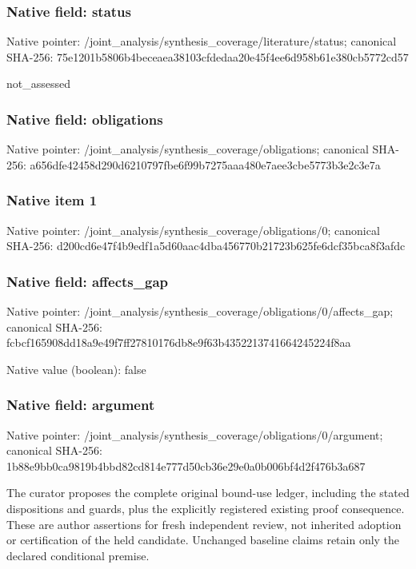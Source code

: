 \documentclass[10pt,a4paper]{article}
\begin{document}
\subsubsection{Native field: status}
Native pointer: /joint\_\allowbreak{}analysis/synthesis\_\allowbreak{}coverage/literature/status; canonical SHA-256: 75e1201b5806b4beceaea38103cfdedaa20e45f4ee6d958b61e380cb5772cd57

\begingroup\raggedright\sloppy not\_\allowbreak{}assessed\par\endgroup

\subsubsection{Native field: obligations}
Native pointer: /joint\_\allowbreak{}analysis/synthesis\_\allowbreak{}coverage/obligations; canonical SHA-256: a656dfe42458d290d6210797fbe6f99b7275aaa480e7aee3cbe5773b3e2c3e7a

\subsubsection{Native item 1}
Native pointer: /joint\_\allowbreak{}analysis/synthesis\_\allowbreak{}coverage/obligations/0; canonical SHA-256: d200cd6e47f4b9edf1a5d60aac4dba456770b21723b625fe6dcf35bca8f3afdc

\subsubsection{Native field: affects\_\allowbreak{}gap}
Native pointer: /joint\_\allowbreak{}analysis/synthesis\_\allowbreak{}coverage/obligations/0/affects\_\allowbreak{}gap; canonical SHA-256: fcbcf165908dd18a9e49f7ff27810176db8e9f63b4352213741664245224f8aa

Native value (boolean): false

\subsubsection{Native field: argument}
Native pointer: /joint\_\allowbreak{}analysis/synthesis\_\allowbreak{}coverage/obligations/0/argument; canonical SHA-256: 1b88e9bb0ca9819b4bbd82cd814e777d50cb36e29e0a0b006bf4d2f476b3a687

\begingroup\raggedright\sloppy The curator proposes the complete original bound-use ledger,\allowbreak{} including the stated dispositions and guards,\allowbreak{} plus the explicitly registered existing proof consequence. These are author assertions for fresh independent review,\allowbreak{} not inherited adoption or certification of the held candidate. Unchanged baseline claims retain only the declared conditional premise.\par\endgroup
\end{document}

